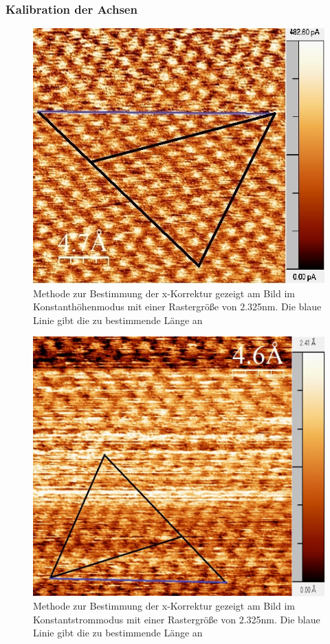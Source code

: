 \documentclass[12pt,a4paper]{article}
\begin{document}
\subsubsection{Kalibration der Achsen}

\begin{figure}
\centering
\includegraphics[scale=0.8]{Bilder/Atome/hoch2_h_scale.jpg}
\caption{Methode zur Bestimmung der x-Korrektur gezeigt am Bild im Konstanthöhenmodus mit einer Rastergröße von 2.325nm. Die blaue Linie gibt die zu bestimmende Länge an}
\label{fig:hoch2_h}
\end{figure}

\begin{figure}
\centering
\includegraphics[scale=0.5]{Bilder/Atome/strom2_h_scale.jpg}
\caption{Methode zur Bestimmung der x-Korrektur gezeigt am Bild im Konstantstrommodus mit einer Rastergröße von 2.325nm. Die blaue Linie gibt die zu bestimmende Länge an}
\label{fig:strom2_h}
\end{figure}
\end{document}
